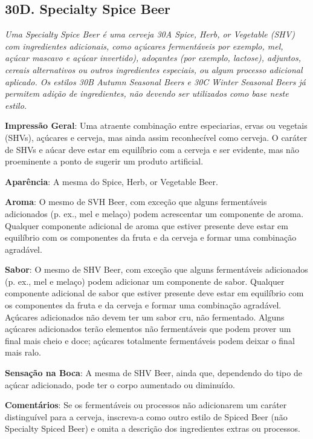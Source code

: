 \subsection*{30D. Specialty Spice Beer}
\textit{Uma Specialty Spice Beer é uma cerveja 30A Spice, Herb, or Vegetable (SHV) com ingredientes adicionais, como açúcares fermentáveis por exemplo, mel, açúcar mascavo e açúcar invertido), adoçantes (por exemplo, lactose), adjuntos, cereais alternativos ou outros ingredientes especiais, ou algum processo adicional aplicado. Os estilos 30B Autumn Seasonal Beers e 30C Winter Seasonal Beers já permitem adição de ingredientes, não devendo ser utilizados como base neste estilo.}

\textbf{Impressão Geral}: Uma atraente combinação entre especiarias, ervas ou vegetais (SHVs), açúcares e cerveja, mas ainda assim reconhecível como cerveja. O caráter de SHVs e aúcar deve estar em equilíbrio com a cerveja e ser evidente, mas não proeminente a ponto de sugerir um produto artificial.

\textbf{Aparência}: A mesma do Spice, Herb, or Vegetable Beer.

\textbf{Aroma}: O mesmo de SVH Beer, com exceção que alguns fermentáveis adicionados (p. ex., mel e melaço) podem acrescentar um componente de aroma. Qualquer componente adicional de aroma que estiver presente deve estar em equilíbrio com os componentes da fruta e da cerveja e formar uma combinação agradável.

\textbf{Sabor}: O mesmo de SHV Beer, com exceção que alguns fermentáveis adicionados (p. ex., mel e melaço) podem adicionar um componente de sabor. Qualquer componente adicional de sabor que estiver presente deve estar em equilíbrio com os componentes da fruta e da cerveja e formar uma combinação agradável. Açúcares adicionados não devem ter um sabor cru, não fermentado. Alguns açúcares adicionados terão elementos não fermentáveis que podem prover um final mais cheio e doce; açúcares totalmente fermentáveis podem deixar o final mais ralo.

\textbf{Sensação na Boca}: A mesma de SHV Beer, ainda que, dependendo do tipo de açúcar adicionado, pode ter o corpo aumentado ou diminuído.

\textbf{Comentários}: Se os fermentáveis ou processos não adicionarem um caráter distinguível para a cerveja, inscreva-a como outro estilo de Spiced Beer (não Specialty Spiced Beer) e omita a descrição dos ingredientes extras ou processos.

